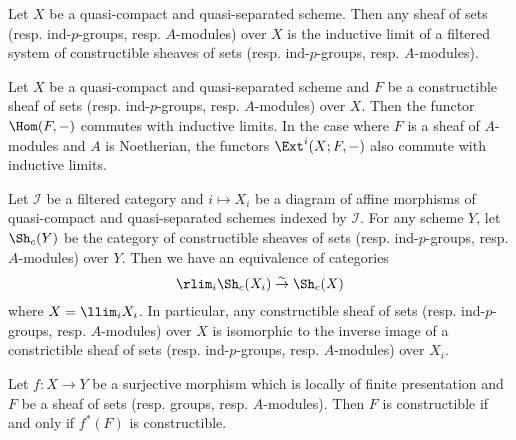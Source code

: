 \begin{corollary}\label{scheme qcqs etale sheaf limit of constructible}
Let $X$ be a quasi-compact and quasi-separated scheme. Then any sheaf of sets (resp. ind-$p$-groups, resp. $A$-modules) over $X$ is the inductive limit of a filtered system of constructible sheaves of sets (resp. ind-$p$-groups, resp. $A$-modules).
\end{corollary}

\begin{corollary}\label{scheme qcqs etale sheaf Hom on constructible commutes with limit}
Let $X$ be a quasi-compact and quasi-separated scheme and $F$ be a constructible sheaf of sets (resp. ind-$p$-groups, resp. $A$-modules) over $X$. Then the functor $\Hom(F,-)$ commutes with inductive limits. In the case where $F$ is a sheaf of $A$-modules and $A$ is Noetherian, the functors $\Ext^i(X;F,-)$ also commute with inductive limits.
\end{corollary}

\begin{corollary}\label{scheme constructible sheaf cat under limit prop}
Let $\mathcal{I}$ be a filtered category and $i\mapsto X_i$ be a diagram of affine morphisms of quasi-compact and quasi-separated schemes indexed by $\mathcal{I}$. For any scheme $Y$, let $\Sh_c(Y)$ be the category of constructible sheaves of sets (resp. ind-$p$-groups, resp. $A$-modules) over $Y$. Then we have an equivalence of categories
\[\rlim_i\Sh_c(X_i) \stackrel{\sim}{\to} \Sh_c(X)\]
where $X=\llim_iX_i$. In particular, any constructible sheaf of sets (resp. ind-$p$-groups, resp. $A$-modules) over $X$ is isomorphic to the inverse image of a constrictible sheaf of sets (resp. ind-$p$-groups, resp. $A$-modules) over $X_i$.
\end{corollary}

\begin{proposition}\label{scheme constructible sheaf under surj local fp prop}
Let $f:X\to Y$ be a surjective morphism which is locally of finite presentation and $F$ be a sheaf of sets (resp. groups, resp. $A$-modules). Then $F$ is constructible if and only if $f^*(F)$ is constructible.
\end{proposition}

